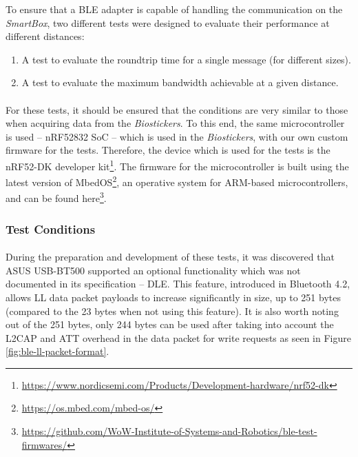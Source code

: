 To ensure that a \acs{BLE} adapter is capable of handling the communication on the \textit{SmartBox}, two different tests were designed to evaluate their performance at different distances: 

\renewcommand{\labelenumi}{\textit{\alph{enumi})}}

\begin{enumerate}
    \item A test to evaluate the roundtrip time for a single message (for different sizes).
    \item A test to evaluate the maximum bandwidth achievable at a given distance. 
\end{enumerate}
\renewcommand{\labelenumi}{\arabic{enumi}.}

\paragraph{} For these tests, it should be ensured that the conditions are very similar to those when acquiring data from the \textit{Biostickers}. To this end, the same microcontroller is used -- nRF52832 \acs{SoC} -- which is used in the \textit{Biostickers}, with our own custom firmware for the tests. Therefore, the device which is used for the tests is the nRF52-DK developer kit\footnote{\url{https://www.nordicsemi.com/Products/Development-hardware/nrf52-dk}}. The firmware for the microcontroller is built using the latest version of MbedOS\footnote{\url{https://os.mbed.com/mbed-os/}}, an operative system for ARM-based microcontrollers, and can be found here\footnote{\url{https://github.com/WoW-Institute-of-Systems-and-Robotics/ble-test-firmwares/}}.

\subsubsection{Test Conditions}
\label{sec:ble_test_conditions}
\paragraph{} During the preparation and development of these tests, it was discovered that ASUS USB-BT500 supported an optional functionality which was not documented in its specification -- \acf{DLE}. This feature, introduced in Bluetooth 4.2, allows \acs{LL} data packet payloads to increase significantly in size, up to 251 bytes (compared to the 23 bytes when not using this feature). It is also worth noting out of the 251 bytes, only 244 bytes can be used after taking into account the \acs{L2CAP} and \acs{ATT} overhead in the data packet for write requests as seen in Figure \ref{fig:ble-ll-packet-format}.

